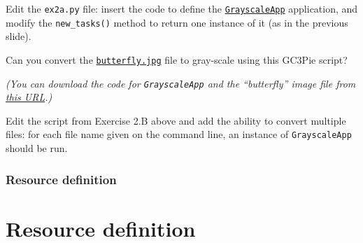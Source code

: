 \documentclass[english,serif,mathserif,xcolor=pdftex,dvipsnames,table]{beamer}
\begin{document}
\begin{frame}[fragile]
  \small

  \begin{exercise*}[2.B]

    \+
    Edit the \texttt{ex2a.py} file: insert the code to define the
    \href{https://raw.githubusercontent.com/uzh/gc3pie/master/docs/programmers/tutorials/workflows/downloads/grayscale_app.py}{\texttt{GrayscaleApp}}
    application, and modify the \texttt{new\_tasks()} method to return
    one instance of it (as in the previous slide).

    \+
    Can you convert the \href{https://raw.githubusercontent.com/uzh/gc3pie/master/docs/programmers/tutorials/workflows/butterfly.jpg}{\texttt{butterfly.jpg}} file to gray-scale using
    this GC3Pie script?

    \+ \footnotesize
    {\em (You can download the code for \texttt{GrayscaleApp} and the ``butterfly'' image file from
    \href{https://raw.githubusercontent.com/uzh/gc3pie/master/docs/programmers/tutorials/workflows/}{this
      URL}.)}
  \end{exercise*}

  \+
  \begin{exercise*}[2.C]

    Edit the script from Exercise 2.B above and add the ability to
    convert multiple files: for each file name given on the command
    line, an instance of \texttt{GrayscaleApp} should be run.
  \end{exercise*}
\end{frame}


\section{Resource definition}
\part{Resource definition}
\end{document}
